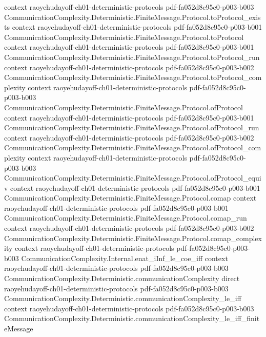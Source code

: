 \begin{theorem}
  {context}
  {raoyehudayoff-ch01-deterministic-protocols}
  {pdf-fa052d8c95c0-p003-b003}
\proofstep
  {CommunicationComplexity.Deterministic.FiniteMessage.Protocol.toProtocol_exists}
  {context}
  {raoyehudayoff-ch01-deterministic-protocols}
  {pdf-fa052d8c95c0-p003-b001}
\proofstep
  {CommunicationComplexity.Deterministic.FiniteMessage.Protocol.toProtocol}
  {context}
  {raoyehudayoff-ch01-deterministic-protocols}
  {pdf-fa052d8c95c0-p003-b001}
\proofstep
  {CommunicationComplexity.Deterministic.FiniteMessage.Protocol.toProtocol_run}
  {context}
  {raoyehudayoff-ch01-deterministic-protocols}
  {pdf-fa052d8c95c0-p003-b002}
\proofstep
  {CommunicationComplexity.Deterministic.FiniteMessage.Protocol.toProtocol_complexity}
  {context}
  {raoyehudayoff-ch01-deterministic-protocols}
  {pdf-fa052d8c95c0-p003-b003}
\proofstep
  {CommunicationComplexity.Deterministic.FiniteMessage.Protocol.ofProtocol}
  {context}
  {raoyehudayoff-ch01-deterministic-protocols}
  {pdf-fa052d8c95c0-p003-b001}
\proofstep
  {CommunicationComplexity.Deterministic.FiniteMessage.Protocol.ofProtocol_run}
  {context}
  {raoyehudayoff-ch01-deterministic-protocols}
  {pdf-fa052d8c95c0-p003-b002}
\proofstep
  {CommunicationComplexity.Deterministic.FiniteMessage.Protocol.ofProtocol_complexity}
  {context}
  {raoyehudayoff-ch01-deterministic-protocols}
  {pdf-fa052d8c95c0-p003-b003}
\proofstep
  {CommunicationComplexity.Deterministic.FiniteMessage.Protocol.ofProtocol_equiv}
  {context}
  {raoyehudayoff-ch01-deterministic-protocols}
  {pdf-fa052d8c95c0-p003-b001}
\proofstep
  {CommunicationComplexity.Deterministic.FiniteMessage.Protocol.comap}
  {context}
  {raoyehudayoff-ch01-deterministic-protocols}
  {pdf-fa052d8c95c0-p003-b001}
\proofstep
  {CommunicationComplexity.Deterministic.FiniteMessage.Protocol.comap_run}
  {context}
  {raoyehudayoff-ch01-deterministic-protocols}
  {pdf-fa052d8c95c0-p003-b002}
\proofstep
  {CommunicationComplexity.Deterministic.FiniteMessage.Protocol.comap_complexity}
  {context}
  {raoyehudayoff-ch01-deterministic-protocols}
  {pdf-fa052d8c95c0-p003-b003}
\proofstep
  {CommunicationComplexity.Internal.enat_iInf_le_coe_iff}
  {context}
  {raoyehudayoff-ch01-deterministic-protocols}
  {pdf-fa052d8c95c0-p003-b003}
\proofstep
  {CommunicationComplexity.Deterministic.communicationComplexity}
  {direct}
  {raoyehudayoff-ch01-deterministic-protocols}
  {pdf-fa052d8c95c0-p003-b003}
\proofstep
  {CommunicationComplexity.Deterministic.communicationComplexity_le_iff}
  {context}
  {raoyehudayoff-ch01-deterministic-protocols}
  {pdf-fa052d8c95c0-p003-b003}
\proofstep
  {CommunicationComplexity.Deterministic.communicationComplexity_le_iff_finiteMessage}

\end{theorem}
